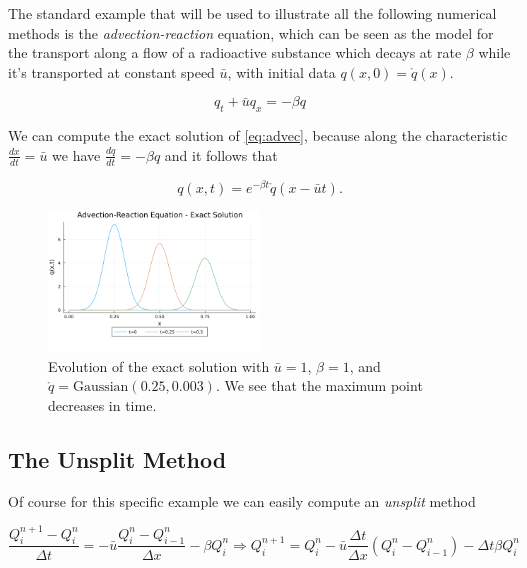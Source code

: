 \documentclass[journal,onecolumn]{IEEEtran}
\begin{document}
The standard example that will be used to illustrate all the following numerical methods is the \textit{advection-reaction} equation, which can be seen as the model for the transport along a flow of a radioactive substance which decays at rate $\beta$ while it's transported at constant speed $\bar{u}$, with initial data $q(x,0)= \mathring{q}(x)$.

\begin{equation}\label{eq:advec}
	q_t + \bar{u}q_x=-\beta q
\end{equation}

We can compute the exact solution of \eqref{eq:advec}, because along the characteristic $\frac{dx}{dt}=\bar{u}$ we have $\frac{dq}{dt}=-\beta q$ and it follows that

\begin{equation}\label{eq:advec_sol}
	q(x,t) = e^{-\beta t}\mathring{q}(x-\bar{u}t).
\end{equation}

\begin{figure}[!ht]
	\centering
	\includegraphics[width=0.5\textwidth]{Advection.png}
	\caption{Evolution of the exact solution with $\bar{u}=1$, $\beta=1$, and $\mathring{q}=\text{Gaussian}(0.25,0.003)$. We see that the maximum point decreases in time.}
	\label{fig:exact}
\end{figure}

\subsection{The Unsplit Method}

Of course for this specific example we can easily compute an \textit{unsplit} method

\begin{equation}\label{eq:unsplit}
	\frac{Q^{n+1}_i-Q^n_i}{\Delta t} = -\bar{u} \frac{Q^n_i-Q^n_{i-1}}{\Delta x}-\beta Q^n_i \Rightarrow Q^{n+1}_i = Q^n_i-\bar{u} \frac{\Delta t}{\Delta x}(Q^n_i-Q^n_{i-1})-\Delta t\beta Q^n_i
\end{equation}
\end{document}
